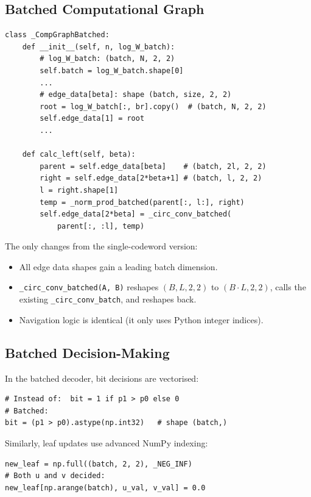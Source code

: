 \documentclass[11pt,a4paper]{article}
\begin{document}
\subsection{Batched Computational Graph}

\begin{lstlisting}[caption={Batched computational graph (\texttt{\_CompGraphBatched})}]
class _CompGraphBatched:
    def __init__(self, n, log_W_batch):
        # log_W_batch: (batch, N, 2, 2)
        self.batch = log_W_batch.shape[0]
        ...
        # edge_data[beta]: shape (batch, size, 2, 2)
        root = log_W_batch[:, br].copy()  # (batch, N, 2, 2)
        self.edge_data[1] = root
        ...

    def calc_left(self, beta):
        parent = self.edge_data[beta]    # (batch, 2l, 2, 2)
        right = self.edge_data[2*beta+1] # (batch, l, 2, 2)
        l = right.shape[1]
        temp = _norm_prod_batched(parent[:, l:], right)
        self.edge_data[2*beta] = _circ_conv_batched(
            parent[:, :l], temp)
\end{lstlisting}

The only changes from the single-codeword version:
\begin{itemize}
    \item All edge data shapes gain a leading batch dimension.
    \item \texttt{\_circ\_conv\_batched(A, B)} reshapes $(B, L, 2, 2)$ to $(B \cdot L, 2, 2)$, calls the existing \texttt{\_circ\_conv\_batch}, and reshapes back.
    \item Navigation logic is identical (it only uses Python integer indices).
\end{itemize}

\subsection{Batched Decision-Making}

In the batched decoder, bit decisions are vectorised:

\begin{lstlisting}[caption={Vectorised bit decisions}]
# Instead of:  bit = 1 if p1 > p0 else 0
# Batched:
bit = (p1 > p0).astype(np.int32)   # shape (batch,)
\end{lstlisting}

Similarly, leaf updates use advanced NumPy indexing:

\begin{lstlisting}[caption={Vectorised leaf update}]
new_leaf = np.full((batch, 2, 2), _NEG_INF)
# Both u and v decided:
new_leaf[np.arange(batch), u_val, v_val] = 0.0
\end{lstlisting}
\end{document}
